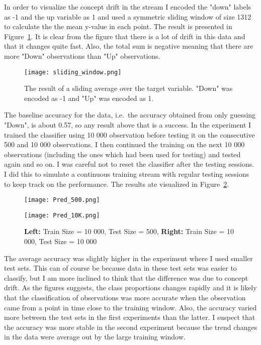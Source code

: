 \documentclass[11pt,twoside,swedish]{article}
\begin{document}
In order to visualize the concept drift in the stream I encoded the
"down" labels as -1 and the up variable as 1 and used a symmetric sliding window
of size 1312 to calculate the the mean y-value in each point. The
result is presented in Figure~\ref{mini 5 sliding window}. It is clear
from the figure that there is a lot of drift in this data and that it
changes quite fast. Also, the total sum is negative meaning that
there are more "Down" observations than "Up" observations.

\graphicspath{{/home/mikael/Repos/Courses/msa220/Mini/Mini/Mini_5/}}
\begin{figure}[!htb]
\begin{center}
\texttt{[image: sliding\_window.png]}
\caption{The result of a sliding average over the target
  variable. "Down" was encoded as -1 and "Up" was encoded as 1.}
\label{mini 5 sliding window}
\end{center}
\end{figure}

The baseline accuracy for the data, i.e.\ the accuracy obtained from
only guessing "Down", is about 0.57, so any result above that is a
success. In the experiment I trained the classifier using 10 000
observation before testing it on the consecutive 500 and 10 000
observations. I then continued the training on the next 10 000
observations (including the ones which had been used for testing) and
tested again and so on. I was careful not to reset the classifier
after the testing sessions. I did this to simulate a continuous
training stream with regular testing sessions to keep track on the
performance. The results ate visualized in Figure~\ref{mini 5 result}.

\begin{figure}[!h]
\begin{minipage}{0.45\textwidth}
\texttt{[image: Pred\_500.png]}
\end{minipage}
\begin{minipage}{0.45\textwidth}
\texttt{[image: Pred\_10K.png]}
\end{minipage}
\label{mini 5 result}
\caption{\textbf{Left:} Train Size = 10 000, Test Size = 500,
  \textbf{Right:} Train Size = 10 000, Test Size = 10 000}
\end{figure}

The average accuracy was slightly higher in the experiment where I
used smaller test sets. This can of course be because data in these
test sets was easier to classify, but I am more inclined to think that the
difference was due to concept drift. As the figures suggests, the
class proportions changes rapidly and it is likely that the
classification  of observations was more accurate when the observation
came from a point in time close to the training window. Also, the
accuracy varied more between the test sets in the first experiments
than the latter. I suspect that the accuracy was more stable in the
second experiment because the trend changes in the data were average
out by the large training window.
\end{document}
